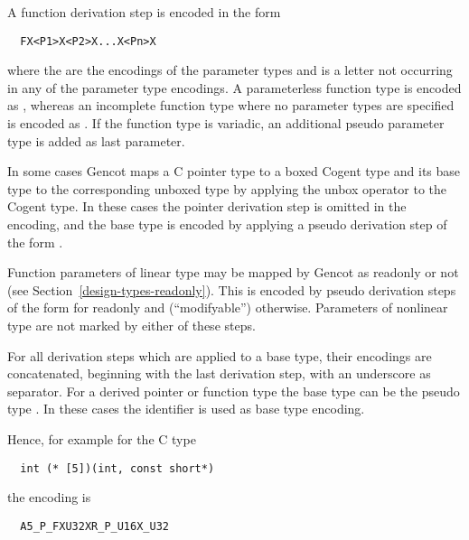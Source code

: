 A function derivation step is encoded in the form
\begin{verbatim}
  FX<P1>X<P2>X...X<Pn>X
\end{verbatim}
where the  are the encodings of the parameter types and  is a letter not occurring in 
any of the parameter type encodings. A parameterless function type is encoded as , whereas an
incomplete function type where no parameter types are specified is encoded as .
If the function type is variadic, an additional pseudo parameter type 
is added as last parameter. 

In some cases Gencot maps a C pointer type to a boxed Cogent type and its base type to the corresponding
unboxed type by applying the unbox operator \code{\#} to the Cogent type. In these cases the pointer derivation
step is omitted in the encoding, and the base type is encoded by applying a pseudo derivation step 
of the form .

Function parameters of linear type may be mapped by Gencot as readonly or not (see Section~\ref{design-types-readonly}). 
This is encoded by pseudo derivation steps of the form  for readonly and  (``modifyable'')
otherwise. Parameters of nonlinear type are not marked by either of these steps.

For all derivation steps which are applied to a base type, their encodings are concatenated, beginning with the 
last derivation step, with an underscore \code{\_} as separator. For a derived pointer or 
function type the base type can be the pseudo type . In these cases the identifier  is
used as base type encoding.

Hence, for example for the C type
\begin{verbatim}
  int (* [5])(int, const short*)
\end{verbatim}
the encoding is
\begin{verbatim}
  A5_P_FXU32XR_P_U16X_U32
\end{verbatim}

